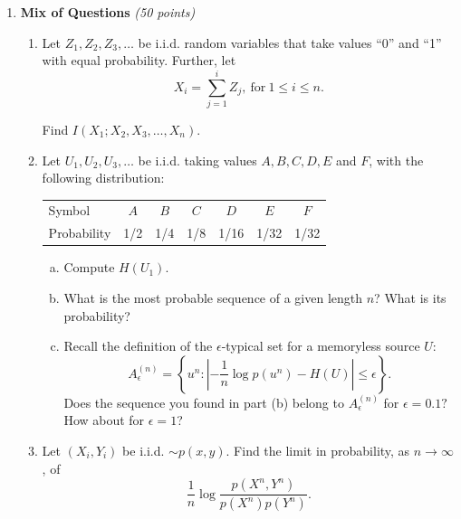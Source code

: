 \documentclass[12pt]{article}
\begin{document}
\begin{enumerate}


\item  {\bf Mix of Questions} {\it (50 points)}\\


\begin{enumerate}[1)]

\item Let $Z_1, Z_2, Z_3, \ldots$ be i.i.d. random variables that take values ``0'' and ``1'' with equal probability. Further, let
\begin{equation}
X_i = \sum_{j=1}^i Z_j, \ \text{for} \ 1 \leq i \leq n.
\end{equation}

Find $I(X_1; X_2, X_3, \ldots, X_n)$.


\item Let $U_1, U_2, U_3, \ldots$ be i.i.d. taking values $A, B, C, D, E$ and $F$, with the following distribution:
\begin{table}[htbp]
\begin{center}
\begin{tabular}{l|cccccc}
Symbol & $A$ & $B$ & $C$ & $D$ & $E$ & $F$ \\
Probability  & 1/2 & 1/4 & 1/8 & 1/16 & 1/32 &  1/32
\end{tabular}
\end{center}
\end{table}


\begin{enumerate}[(a)]
\item Compute $H(U_1)$.  
\item What is the most probable sequence of a given length $n$? What is its probability?
\item Recall the definition of the $\epsilon$-typical set for a memoryless source $U$: 
\begin{equation}
A_\epsilon^{(n)} = \left \{ u^n: \left| -\frac{1}{n} \log p(u^n) - H(U) \right| \leq \epsilon \right \}.
\end{equation} 
Does the sequence you found in part (b) belong to $A_\epsilon^{(n)}$ for $\epsilon= 0.1?$ How about for $\epsilon= 1$? 
\end{enumerate}

\item Let $(X_i, Y_i)$ be i.i.d. $\sim p(x,y)$. Find the limit in probability, as $n \rightarrow \infty$, of 
\begin{equation}
\frac{1}{n} \log \frac{p(X^n, Y^n)}{p(X^n)p(Y^n)}.
\end{equation}




\end{enumerate}
\end{enumerate}
\end{document}
